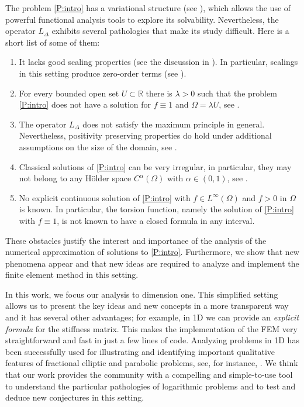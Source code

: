 \documentclass[11 pt]{article}
\numberwithin{equation}{section}
\def\R{\mathbb{R}}
\begin{document}
The problem \eqref{P:intro} has a variational structure (see \cite{CW19}), which allows the use of powerful functional analysis tools to explore its solvability. Nevertheless, the operator $L_\Delta$ exhibits several pathologies that make its study difficult. Here is a short list of some of them:
\begin{enumerate}
    \item It lacks good scaling properties (see the discussion in \cite{CS22}).  In particular, scalings in this setting produce zero-order terms (see \cite[Appendix A.1]{HSLRS23}).
    \item For every bounded open set $U\subset \R$ there is $\lambda>0$ such that the problem \eqref{P:intro} does not have a solution for $f\equiv 1$ and $\Omega=\lambda U$, see \cite[Remark 5.9]{CS22}.
    \item The operator $L_\Delta$ does not satisfy the maximum principle in general. Nevertheless, positivity preserving properties do hold under additional assumptions on the size of the domain, see \cite[Theorem 1.8 and Corollary 1.9]{CW19}.
    \item Classical solutions of \eqref{P:intro} can be very irregular, in particular, they may not belong to any Hölder space $C^\alpha(\Omega)$ with $\alpha\in(0,1)$, see \cite[Remark 5.6]{CS22}.
    \item No explicit continuous solution of \eqref{P:intro} with $f\in L^\infty(\Omega)$ and $f>0$ in $\Omega$ is known. In particular, the torsion function, namely the solution of \eqref{P:intro} with $f\equiv 1$, is not known to have a closed formula in any interval.
\end{enumerate}

 These obstacles justify the interest and importance of the analysis of the numerical approximation of solutions to \eqref{P:intro}.  Furthermore, we show that new phenomena appear and that new ideas are required to analyze and implement the finite element method in this setting.

In this work, we focus our analysis to dimension one. This simplified setting allows us to present the key ideas and new concepts in a more transparent way and it has several other advantages; for example, in 1D we can provide an \emph{explicit formula} for the stiffness matrix.  This makes the implementation of the FEM very straightforward and fast in just a few lines of code.  Analyzing problems in 1D has been successfully used for illustrating and identifying important qualitative features of fractional elliptic and parabolic problems, see, for instance, \cite{ABBM18,BdPM18,BHS19,CGH20}. We think that our work provides the community with a compelling and simple-to-use tool to understand the particular pathologies of logarithmic problems and to test and deduce new conjectures in this setting.
\end{document}
